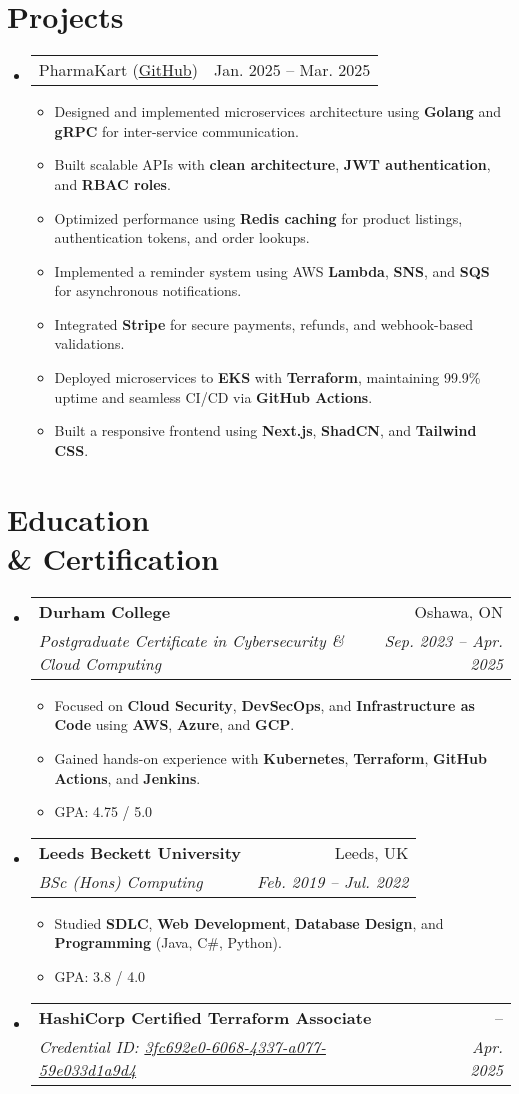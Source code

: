 \documentclass[letterpaper,11pt]{article}
\makeatletter
\newcommand{\resumeItem}[1]{\item\small{#1 \vspace{0pt}}}
\newcommand{\resumeSubheading}[4]{
  \vspace{-5pt}\item
    \begin{tabular*}{0.97\textwidth}[t]{l@{\extracolsep{\fill}}r}
      \textbf{#1} & #2 \\
      \textit{\small#3} & \textit{\small #4} \\
    \end{tabular*}\vspace{-7pt}
}
\newcommand{\resumeProjectHeading}[2]{
    \item
    \begin{tabular*}{0.97\textwidth}{l@{\extracolsep{\fill}}r}
      \small#1 & #2 \\
    \end{tabular*}\vspace{-7pt}
}
\makeatother
\begin{document}
\section*{Projects}
\begin{itemize}[leftmargin=*]
  \resumeProjectHeading{PharmaKart (\href{https://github.com/pharmakart/pharmakart-web}{GitHub})}{Jan. 2025 -- Mar. 2025}
  \begin{itemize}
    \resumeItem{Designed and implemented microservices architecture using \textbf{Golang} and \textbf{gRPC} for inter-service communication.}
    \resumeItem{Built scalable APIs with \textbf{clean architecture}, \textbf{JWT authentication}, and \textbf{RBAC roles}.}
    \resumeItem{Optimized performance using \textbf{Redis caching} for product listings, authentication tokens, and order lookups.}
    \resumeItem{Implemented a reminder system using AWS \textbf{Lambda}, \textbf{SNS}, and \textbf{SQS} for asynchronous notifications.}
    \resumeItem{Integrated \textbf{Stripe} for secure payments, refunds, and webhook-based validations.}
    \resumeItem{Deployed microservices to \textbf{EKS} with \textbf{Terraform}, maintaining 99.9\% uptime and seamless CI/CD via \textbf{GitHub Actions}.}
    \resumeItem{Built a responsive frontend using \textbf{Next.js}, \textbf{ShadCN}, and \textbf{Tailwind CSS}.}
\end{itemize}
\end{itemize}

\section*{Education \\ \& Certification}
\begin{itemize}[leftmargin=*]
  \resumeSubheading{Durham College}{Oshawa, ON}{Postgraduate Certificate in Cybersecurity \& Cloud Computing}{Sep. 2023 -- Apr. 2025}
  \begin{itemize}
    \resumeItem{Focused on \textbf{Cloud Security}, \textbf{DevSecOps}, and \textbf{Infrastructure as Code} using \textbf{AWS}, \textbf{Azure}, and \textbf{GCP}.}
    \resumeItem{Gained hands-on experience with \textbf{Kubernetes}, \textbf{Terraform}, \textbf{GitHub Actions}, and \textbf{Jenkins}.}
    \resumeItem{GPA: 4.75 / 5.0}
  \end{itemize}

  \resumeSubheading{Leeds Beckett University}{Leeds, UK}{BSc (Hons) Computing}{Feb. 2019 -- Jul. 2022}
  \begin{itemize}
    \resumeItem{Studied \textbf{SDLC}, \textbf{Web Development}, \textbf{Database Design}, and \textbf{Programming} (Java, C\#, Python).}
    \resumeItem{GPA: 3.8 / 4.0}
  \end{itemize}

  \resumeSubheading{HashiCorp Certified Terraform Associate}{--}{Credential ID: \href{https://www.credly.com/badges/3fc692e0-6068-4337-a077-59e033d1a9d4/public_url}{3fc692e0-6068-4337-a077-59e033d1a9d4}}{Apr. 2025}
\end{itemize}
\end{document}
